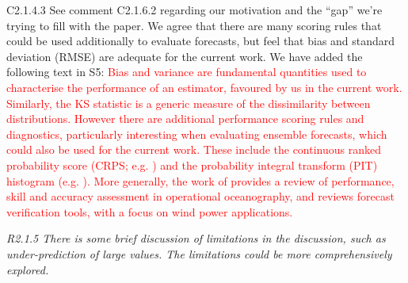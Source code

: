 \documentclass[a4paper,10pt]{article}
\newcommand{\ed}[1]{\textcolor{red}{#1}}
\begin{document}
	C2.1.4.3 See comment C2.1.6.2 regarding our motivation and the ``gap'' we're trying to fill with the paper. We agree that there are many scoring rules that could be used additionally to evaluate forecasts, but feel that bias and standard deviation (RMSE) are adequate for the current work. We have added the following text in S5: \ed{Bias and variance are fundamental quantities used to characterise the performance of an estimator, favoured by us in the current work. Similarly, the KS statistic is a generic measure of the dissimilarity between distributions. However there are additional performance scoring rules and diagnostics, particularly interesting when evaluating ensemble forecasts, which could also be used for the current work. These include the continuous ranked probability score (CRPS;  e.g. \citealt{GntEA05}) and the probability integral transform (PIT) histogram (e.g. \citealt{Dwd84}). More generally, the work of \cite{HrnEA18a} provides a review of performance, skill and accuracy assessment in operational oceanography, and \cite{MssEA20} reviews forecast verification tools, with a focus on wind power applications.}  
		
	\emph{R2.1.5 There is some brief discussion of limitations in the discussion, such as under-prediction of large values. The limitations could be more comprehensively explored.}
	
\end{document}

